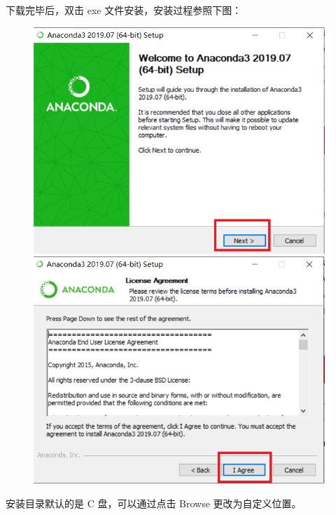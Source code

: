 下载完毕后，双击 exe 文件安装，安装过程参照下图：


\begin{figure}[!ht]
  \centering
  \includegraphics[scale=0.5]{figure/chapter1/anaconda7.png}\quad
  \includegraphics[scale=0.5]{figure/chapter1/anaconda8.png}
\end{figure}

安装目录默认的是 C 盘，可以通过点击 Browse 更改为自定义位置。


